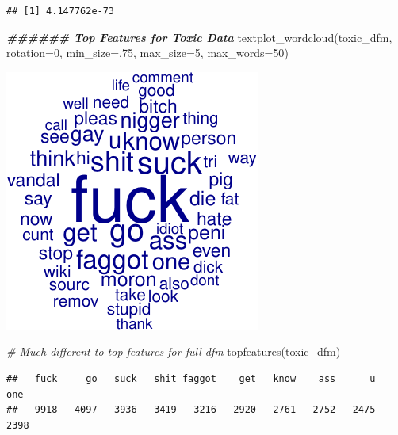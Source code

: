 \documentclass[
]{article}
\newenvironment{Shaded}{\begin{snugshade}}{\end{snugshade}}
\newcommand{\AttributeTok}[1]{\textcolor[rgb]{0.77,0.63,0.00}{#1}}
\newcommand{\CommentTok}[1]{\textcolor[rgb]{0.56,0.35,0.01}{\textit{#1}}}
\newcommand{\DecValTok}[1]{\textcolor[rgb]{0.00,0.00,0.81}{#1}}
\newcommand{\DocumentationTok}[1]{\textcolor[rgb]{0.56,0.35,0.01}{\textbf{\textit{#1}}}}
\newcommand{\FunctionTok}[1]{\textcolor[rgb]{0.00,0.00,0.00}{#1}}
\newcommand{\NormalTok}[1]{#1}
\newcommand{\SpecialCharTok}[1]{\textcolor[rgb]{0.00,0.00,0.00}{#1}}
\begin{document}
\begin{Shaded}
\end{Shaded}

\begin{verbatim}
## [1] 4.147762e-73
\end{verbatim}

\begin{Shaded}
\begin{Highlighting}[]
\DocumentationTok{\#\#\#\#\#\# Top Features for Toxic Data}
\FunctionTok{textplot\_wordcloud}\NormalTok{(toxic\_dfm, }\AttributeTok{rotation=}\DecValTok{0}\NormalTok{, }\AttributeTok{min\_size=}\NormalTok{.}\DecValTok{75}\NormalTok{, }\AttributeTok{max\_size=}\DecValTok{5}\NormalTok{, }\AttributeTok{max\_words=}\DecValTok{50}\NormalTok{)}
\end{Highlighting}
\end{Shaded}

\includegraphics{classifier_files/figure-latex/eda-3.pdf}

\begin{Shaded}
\begin{Highlighting}[]
\CommentTok{\# Much different to top features for full dfm}
\FunctionTok{topfeatures}\NormalTok{(toxic\_dfm)}
\end{Highlighting}
\end{Shaded}

\begin{verbatim}
##   fuck     go   suck   shit faggot    get   know    ass      u    one 
##   9918   4097   3936   3419   3216   2920   2761   2752   2475   2398
\end{verbatim}
\end{document}
